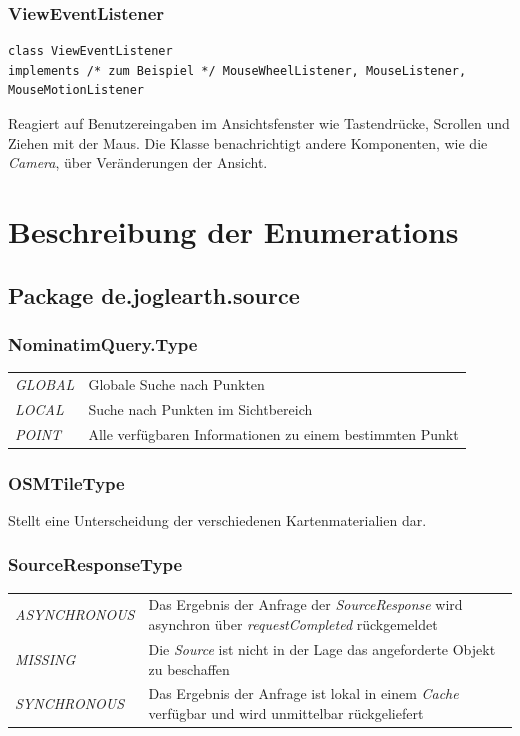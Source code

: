\documentclass[10pt]{scrreprt}
\begin{document}
\vspace{5mm}
\subsection*{ViewEventListener}
\begin{lstlisting}
class ViewEventListener
implements /* zum Beispiel */ MouseWheelListener, MouseListener, MouseMotionListener
\end{lstlisting}
Reagiert auf Benutzereingaben im Ansichtsfenster wie Tastendrücke, Scrollen und Ziehen mit der Maus. Die Klasse benachrichtigt andere Komponenten, wie die \textit{Camera}, über Veränderungen der Ansicht.\\




\chapter{Beschreibung der Enumerations}
\section*{Package de.joglearth.source}

\subsection*{NominatimQuery.Type}
\begin{tabular}{p{4cm} p{11cm}}
\textit{GLOBAL} & Globale Suche nach Punkten \\
\textit{LOCAL} & Suche nach Punkten im Sichtbereich \\
\textit{POINT} & Alle verfügbaren Informationen zu einem bestimmten Punkt \\
\end{tabular}

\vspace{5mm}
\subsection*{OSMTileType}
Stellt eine Unterscheidung der verschiedenen Kartenmaterialien dar.

\vspace{5mm}
\subsection*{SourceResponseType}
\begin{tabular}{p{4cm} p{11cm}}
\textit{ASYNCHRONOUS} & Das Ergebnis der Anfrage der \textit{SourceResponse} wird asynchron über \textit{requestCompleted} rückgemeldet\\
\textit{MISSING} & Die \textit{Source} ist nicht in der Lage das angeforderte Objekt zu beschaffen\\
\textit{SYNCHRONOUS} & Das Ergebnis der Anfrage ist lokal in einem \textit{Cache} verfügbar und wird unmittelbar rückgeliefert \\
\end{tabular}
\end{document}

